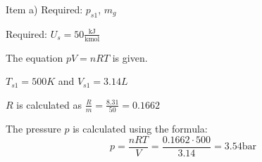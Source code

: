 Item a) Required: \( p_{s1} \), \( m_{g} \)

Required: \( U_{s} = 50 \frac{\text{kJ}}{\text{kmol}} \)

The equation \( pV = nRT \) is given.

\( T_{s1} = 500K \) and \( V_{s1} = 3.14L \)

\( R \) is calculated as \( \frac{R}{m} = \frac{8.31}{50} = 0.1662 \)

The pressure \( p \) is calculated using the formula:
\[
p = \frac{nRT}{V} = \frac{0.1662 \cdot 500}{3.14} = 3.54 \text{bar}
\]
